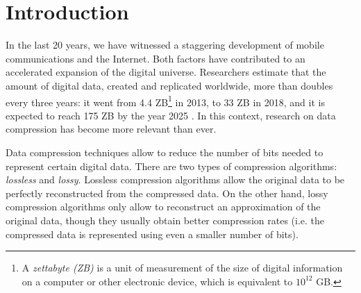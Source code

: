 
\chapter{Introduction} %
\label{intro:intro} %


\newcommand{\maxerror}{\textit{$\epsilon$}\xspace}
\newcommand{\maskalgo}{\textit{M}\xspace}
\newcommand{\NOmaskalgo}{\textit{NM}\xspace}
\newcommand{\alOne}{a_1}
\newcommand{\alTwo}{a_2}
\newcommand{\RD}{\textnormal{RD}}

\newcommand{\zetafoot}{\footnote{A \textit{zettabyte (ZB)} is a unit of measurement of the size of digital information on a computer or other electronic device, which is equivalent to $10^{12}$ GB.} }


In the last 20 years, we have witnessed a staggering development of mobile communications and the Internet. Both factors have contributed to an accelerated expansion of the digital universe. Researchers estimate that the amount of digital data, created and replicated worldwide, more than doubles every three years: it went from 4.4 ZB\zetafoot in 2013, to 33 ZB in 2018, and it is expected to reach 175 ZB by the year 2025 \cite{Digitalization1, Digitalization2}. In this context, research on data compression has become more relevant than ever.


Data compression techniques allow to reduce the number of bits needed to represent certain digital data. There are two types of compression algorithms: \textit{lossless} and \textit{lossy}. Lossless compression algorithms allow the original data to be perfectly reconstructed from the compressed data. On the other hand, lossy compression algorithms only allow to reconstruct an approximation of the original data, though they usually obtain better compression rates (i.e. the compressed data is represented using even a smaller number of bits).


